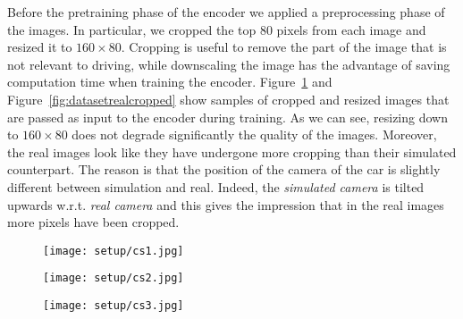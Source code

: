 Before the pretraining phase of the encoder we applied a preprocessing phase of the images. In particular, we cropped the top 80 pixels from each image and resized it to $160 \times 80$. Cropping is useful to remove the part of the image that is not relevant to driving, while downscaling the image has the advantage of saving computation time when training the encoder. Figure~\ref{fig:datasetsimcropped} and Figure~\ref{fig:datasetrealcropped} show samples of cropped and resized images that are passed as input to the encoder during training. As we can see, resizing down to $160 \times 80$ does not degrade significantly the quality of the images. Moreover, the real images look like they have undergone more cropping than their simulated counterpart. The reason is that the position of the camera of the car is slightly different between simulation and real. Indeed, the \textit{simulated camera} is tilted upwards w.r.t. \textit{real camera} and this gives the impression that in the real images more pixels have been cropped.



\begin{figure}[h]
	\begin{minipage}{.33\textwidth}
		\centering
		\texttt{[image: setup/cs1.jpg]}
	\end{minipage}%
	\begin{minipage}{.33\textwidth}
		\centering
		\texttt{[image: setup/cs2.jpg]}
	\end{minipage}%
	\begin{minipage}{.33\textwidth}
		\centering
		\texttt{[image: setup/cs3.jpg]}
	\end{minipage}
	\label{fig:datasetsimcropped}
\end{figure}

